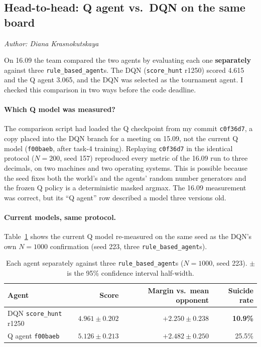 \documentclass[11pt]{article}
\newcommand{\authorline}[1]{\noindent\textit{Author: #1}\par\medskip}
\newcommand{\code}[1]{\texttt{#1}}
\begin{document}

\subsection{Head-to-head: Q agent vs.\ DQN on the same board}
\label{sec:headtohead}
\authorline{Diana Krasnokutskaya}

On 16.09 the team compared the two agents by evaluating each one \textbf{separately}
against three \code{rule\_based\_agent}s. The DQN (\code{score\_hunt} r1250) scored 4.615 and
the Q agent 3.065, and the DQN was selected as the tournament agent. I checked this
comparison in two ways before the code deadline.

\paragraph{Which Q model was measured?}
The comparison script had loaded the Q checkpoint from my commit \code{c0f36d7}, a copy
placed into the DQN branch for a meeting on 15.09, not the current Q model (\code{f00baeb},
after task-4 training). Replaying \code{c0f36d7} in the identical protocol ($N = 200$, seed
157) reproduced every metric of the 16.09 run to three decimals, on two machines and two
operating systems. This is possible because the seed fixes both the world's and the agents'
random number generators and the frozen Q policy is a deterministic masked argmax. The 16.09
measurement was correct, but its ``Q agent'' row described a model three versions old.

\paragraph{Current models, same protocol.}
Table~\ref{tab:seed223} shows the current Q model re-measured on the same seed as the DQN's
own $N = 1000$ confirmation (seed 223, three \code{rule\_based\_agent}s).

\begin{table}[htbp]
  \centering\small
  \caption{Each agent separately against three \texttt{rule\_based\_agent}s ($N = 1000$, seed
    223). $\pm$ is the 95\% confidence interval half-width.}
  \label{tab:seed223}
  \begin{tabular}{@{}l rrr@{}}
    \toprule
    Agent & Score & Margin vs.\ mean opponent & Suicide rate \\
    \midrule
    DQN \code{score\_hunt} r1250 & $4.961 \pm 0.202$ & $+2.250 \pm 0.238$ & \textbf{10.9\%} \\
    Q agent \code{f00baeb} & $\mathbf{5.126 \pm 0.213}$ & $\mathbf{+2.482 \pm 0.250}$ & 25.5\% \\
    \bottomrule
  \end{tabular}
\end{table}
\end{document}
